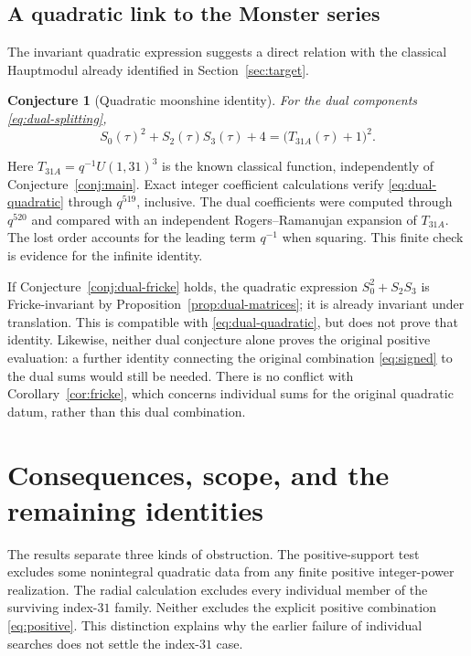 \documentclass[11pt,reqno]{amsart}
\newtheorem{conjecture}[theorem]{Conjecture}
\theoremstyle{remark}
\numberwithin{equation}{section}
\begin{document}
\subsection{A quadratic link to the Monster series}
The invariant quadratic expression suggests a direct relation with
the classical Hauptmodul already identified in
Section~\ref{sec:target}.

\begin{conjecture}[Quadratic moonshine identity]\label{conj:dual-quadratic}
For the dual components \eqref{eq:dual-splitting},
\begin{equation}\label{eq:dual-quadratic}
 S_0(\tau)^2+S_2(\tau)S_3(\tau)+4
   =\bigl(T_{31A}(\tau)+1\bigr)^2.
\end{equation}
\end{conjecture}

Here $T_{31A}=q^{-1}U(1,31)^3$ is the known classical function,
independently of Conjecture~\ref{conj:main}. Exact integer coefficient
calculations verify \eqref{eq:dual-quadratic} through $q^{519}$,
inclusive. The dual coefficients were computed through $q^{520}$
and compared with an independent Rogers--Ramanujan expansion of
$T_{31A}$. The lost order accounts for the leading term $q^{-1}$
when squaring. This finite check is evidence for the infinite identity.

If Conjecture~\ref{conj:dual-fricke} holds, the quadratic expression
$S_0^2+S_2S_3$ is Fricke-invariant by
Proposition~\ref{prop:dual-matrices}; it is already invariant under
translation. This is compatible with \eqref{eq:dual-quadratic}, but
does not prove that identity. Likewise, neither dual conjecture alone
proves the original positive evaluation: a further identity connecting
the original combination \eqref{eq:signed} to the dual sums would
still be needed. There is no conflict with
Corollary~\ref{cor:fricke}, which concerns individual sums for the
original quadratic datum, rather than this dual combination.

\section{Consequences, scope, and the remaining identities}
The results separate three kinds of obstruction. The positive-support
test excludes some nonintegral quadratic data from any finite positive
integer-power realization. The radial calculation excludes every
individual member of the surviving index-$31$ family. Neither excludes
the explicit positive combination \eqref{eq:positive}.
This distinction explains why the earlier failure of individual searches
does not settle the index-$31$ case.
\end{document}
